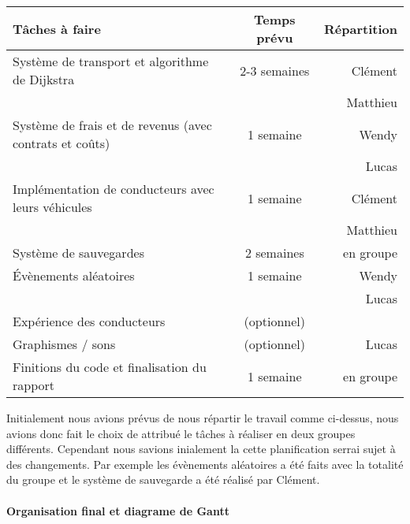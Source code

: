 \documentclass[a4paper, 12pt]{article}
\begin{document}
    
        \begin{tabular}{|l|c|r|}
         \hline
        Tâches à faire & Temps prévu & Répartition \\
        \hline
        Système de transport et algorithme de Dijkstra & 2-3 semaines & Clément\\
        && Matthieu\\
        \hline
         Système de frais et de revenus (avec contrats et coûts)  & 1 semaine & Wendy \\
         && Lucas\\
        \hline
         Implémentation de conducteurs avec leurs véhicules  & 1 semaine & Clément\\
         && Matthieu \\
         \hline
         Système de sauvegardes & 2 semaines & en groupe \\
          \hline
         Évènements aléatoires & 1 semaine & Wendy \\ 
         && Lucas \\
          \hline
          Expérience des conducteurs & (optionnel) & \\
          \hline
         
        Graphismes / sons & (optionnel) & Lucas \\
        \hline
         Finitions du code et finalisation du rapport  & 1 semaine & en groupe \\
         \hline
        \end{tabular}\newline\newline
        Initialement nous avions prévus de nous répartir le travail comme ci-dessus, nous avions donc fait le choix de attribué le tâches à réaliser en deux groupes différents. Cependant nous savions inialement la cette planification serrai sujet à des changements. Par exemple les évènements aléatoires a été faits avec la totalité du groupe et le système de sauvegarde a été réalisé par Clément.  
        
        \newpage
        \paragraph{Organisation final et diagrame de Gantt\newline\newline}
        
\end{document}
